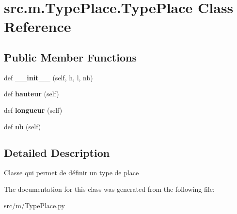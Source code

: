 \hypertarget{classsrc_1_1m_1_1_type_place_1_1_type_place}{}\section{src.\+m.\+Type\+Place.\+Type\+Place Class Reference}
\label{classsrc_1_1m_1_1_type_place_1_1_type_place}
\subsection*{Public Member Functions}
\begin{DoxyCompactItemize}
\item 
\hypertarget{classsrc_1_1m_1_1_type_place_1_1_type_place_a9506a5a3de3fc18d8e09730aa1f7be21}{}def {\bfseries \+\_\+\+\_\+init\+\_\+\+\_\+} (self, h, l, nb)\label{classsrc_1_1m_1_1_type_place_1_1_type_place_a9506a5a3de3fc18d8e09730aa1f7be21}

\item 
\hypertarget{classsrc_1_1m_1_1_type_place_1_1_type_place_af0c1b0a40b71795ec0e9c0ede83d29c9}{}def {\bfseries hauteur} (self)\label{classsrc_1_1m_1_1_type_place_1_1_type_place_af0c1b0a40b71795ec0e9c0ede83d29c9}

\item 
\hypertarget{classsrc_1_1m_1_1_type_place_1_1_type_place_a9effc72597a57232d4999ad1d647922a}{}def {\bfseries longueur} (self)\label{classsrc_1_1m_1_1_type_place_1_1_type_place_a9effc72597a57232d4999ad1d647922a}

\item 
\hypertarget{classsrc_1_1m_1_1_type_place_1_1_type_place_a6766912abdcb3f1d643f59d89662e1f7}{}def {\bfseries nb} (self)\label{classsrc_1_1m_1_1_type_place_1_1_type_place_a6766912abdcb3f1d643f59d89662e1f7}

\end{DoxyCompactItemize}


\subsection{Detailed Description}
\begin{DoxyVerb}    Classe qui permet de définir un type de place
\end{DoxyVerb}
 

The documentation for this class was generated from the following file\+:\begin{DoxyCompactItemize}
\item 
src/m/Type\+Place.\+py\end{DoxyCompactItemize}
